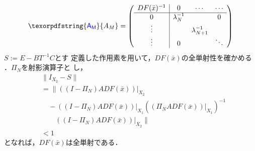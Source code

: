 \documentclass[a4paper,10pt,twocolumn]{jsarticle}
\providecommand{\DIFaddtex}[1]{{\protect\color{blue} \sf #1}} %
\providecommand{\DIFdeltex}[1]{{\protect\color{red} \scriptsize #1}} %
\providecommand{\DIFaddbegin}{} %
\providecommand{\DIFaddend}{} %
\providecommand{\DIFdelbegin}{} %
\providecommand{\DIFdelend}{} %
\providecommand{\DIFadd}[1]{\texorpdfstring{\DIFaddtex{#1}}{#1}} %
\providecommand{\DIFdel}[1]{\texorpdfstring{\DIFdeltex{#1}}{}} %
\newcommand{\DIFscaledelfig}{0.5}
\newlength{\DIFdelgraphicswidth} %
\newlength{\DIFdelgraphicsheight} %
\newcommand{\DIFaddincludegraphics}[2][]{{\color{blue}\fbox{\DIFOincludegraphics[#1]{#2}}}} %
\newcommand{\DIFdelincludegraphics}[2][]{%
\sbox{\DIFdelgraphicsbox}{\DIFOincludegraphics[#1]{#2}}%
\settoboxwidth{\DIFdelgraphicswidth}{\DIFdelgraphicsbox} %
\settoboxtotalheight{\DIFdelgraphicsheight}{\DIFdelgraphicsbox} %
\scalebox{\DIFscaledelfig}{%
\parbox[b]{\DIFdelgraphicswidth}{\usebox{\DIFdelgraphicsbox}\\[-\baselineskip] \rule{\DIFdelgraphicswidth}{0em}}\llap{\resizebox{\DIFdelgraphicswidth}{\DIFdelgraphicsheight}{%
\setlength{\unitlength}{\DIFdelgraphicswidth}%
\begin{picture}(1,1)%
\thicklines\linethickness{2pt} %
{\color[rgb]{1,0,0}\put(0,0){\framebox(1,1){}}}%
{\color[rgb]{1,0,0}\put(0,0){\line( 1,1){1}}}%
{\color[rgb]{1,0,0}\put(0,1){\line(1,-1){1}}}%
\end{picture}%
}\hspace*{3pt}}} %
} %
\DeclareRobustCommand{\DIFaddbegin}{\DIFOaddbegin \let\includegraphics\DIFaddincludegraphics} %
\DeclareRobustCommand{\DIFaddend}{\DIFOaddend \let\includegraphics\DIFOincludegraphics} %
\DeclareRobustCommand{\DIFdelbegin}{\DIFOdelbegin \let\includegraphics\DIFdelincludegraphics} %
\DeclareRobustCommand{\DIFdelend}{\DIFOaddend \let\includegraphics\DIFOincludegraphics} %
\begin{document}
\begin{equation}
  \DIFdelbegin %
\DIFdelend \DIFaddbegin \DIFadd{A_M }\DIFaddend = \DIFdelbegin %
\DIFdelend \DIFaddbegin \left(
  \begin{array}{c|ccc}
    DF(\bar{x})^{-1} & 0 & \cdots & \cdots \\ \hline
    0 & \lambda_N^{-1} &  & 0 \\
    \vdots &  & \lambda_{N+1}^{-1} &  \\
    \vdots & 0 &   & \ddots
  \end{array}\DIFaddend 
  \DIFaddbegin \right)
\DIFaddend \end{equation}
\DIFdelbegin \DIFdel{$S:= E-BT^{-1}C$とす}\DIFdelend \DIFaddbegin \DIFadd{定義した作用素を用いて，$DF(\bar{x})$の全単射性を確かめ}\DIFaddend る\DIFaddbegin \DIFadd{．$\Pi_N$を射影演算子}\DIFaddend と\DIFaddbegin \DIFadd{し}\DIFaddend ，
\begin{equation}
  \begin{split}
    &\| I_{X_2} - S\|\\
    &= \| \left( \left( I-\Pi_N \right) ADF ( \bar{x} ) \right)|_{X_2}  \\
    &\quad -(\left( I-\Pi_N \right) ADF( \bar{x} ))|_{X_1} \left((\Pi_N ADF(\bar{x}))|_{X_1}\right)^{-1}\\
    &\qquad ((I-\Pi_N)ADF(\bar{x}))|_{X_2} \| \\
    & < 1
  \end{split}
\end{equation}
となれば，$DF(\bar{x})$は全単射である．

\DIFdelbegin %
\end{document}
